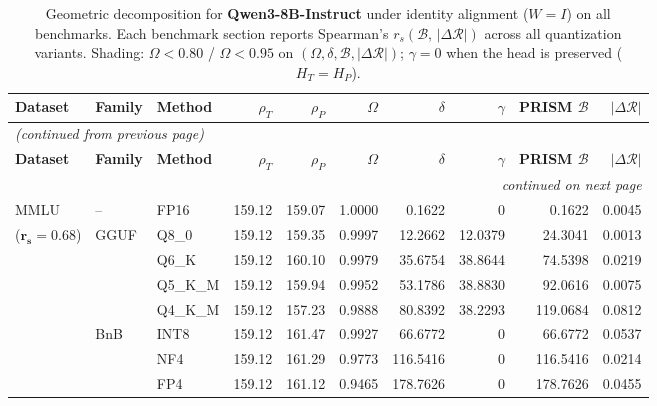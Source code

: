 \begingroup
\small
\setlength{\tabcolsep}{4pt}
\renewcommand{\arraystretch}{1.05}
\setlength{\LTcapwidth}{\textwidth}
\begin{longtable}{ll l rrrrrrr}
\caption{Geometric decomposition for \textbf{Qwen3-8B-Instruct} under identity alignment ($W{=}I$) on all benchmarks. Each benchmark section reports Spearman's $r_s(\mathcal{B},\,|\Delta\mathcal{R}|)$ across all quantization variants. Shading: \colorbox{red!35}{$\Omega{<}0.80$} / \colorbox{red!18}{$\Omega{<}0.95$} on $(\Omega,\delta,\mathcal{B},|\Delta\mathcal{R}|)$; \colorbox{cyan!12}{$\gamma{=}0$} when the head is preserved ($H_T{=}H_P$).}\label{tab:qwen_instruct_decomposition_all_bound}\\
\toprule
\textbf{Dataset} & \textbf{Family} & \textbf{Method} & \textbf{$\rho_T$} & \textbf{$\rho_P$} & \textbf{$\Omega$} & \textbf{$\delta$} & \textbf{$\gamma$} & \textbf{PRISM $\mathcal{B}$} & \textbf{$|\Delta\mathcal{R}|$} \\
\midrule
\endfirsthead
\multicolumn{10}{l}{\small\itshape (continued from previous page)}\\
\toprule
\textbf{Dataset} & \textbf{Family} & \textbf{Method} & \textbf{$\rho_T$} & \textbf{$\rho_P$} & \textbf{$\Omega$} & \textbf{$\delta$} & \textbf{$\gamma$} & \textbf{PRISM $\mathcal{B}$} & \textbf{$|\Delta\mathcal{R}|$} \\
\midrule
\endhead
\midrule
\multicolumn{10}{r}{\small\itshape continued on next page}\\
\endfoot
\bottomrule
\endlastfoot
MMLU & -- & FP16 & 159.12 & 159.07 & 1.0000 & 0.1622 & \cellcolor{cyan!12} $0$ & 0.1622 & 0.0045 \\
{\small ($\mathbf{r_s{=}0.68}$)} & GGUF & Q8\_0 & 159.12 & 159.35 & 0.9997 & 12.2662 & 12.0379 & 24.3041 & 0.0013 \\
 &  & Q6\_K & 159.12 & 160.10 & 0.9979 & 35.6754 & 38.8644 & 74.5398 & 0.0219 \\
 &  & Q5\_K\_M & 159.12 & 159.94 & 0.9952 & 53.1786 & 38.8830 & 92.0616 & 0.0075 \\
 &  & Q4\_K\_M & 159.12 & 157.23 & 0.9888 & 80.8392 & 38.2293 & 119.0684 & 0.0812 \\
 & BnB & INT8 & 159.12 & 161.47 & 0.9927 & 66.6772 & \cellcolor{cyan!12} $0$ & 66.6772 & 0.0537 \\
 &  & NF4 & 159.12 & 161.29 & 0.9773 & 116.5416 & \cellcolor{cyan!12} $0$ & 116.5416 & 0.0214 \\
 &  & FP4 & 159.12 & 161.12 & \cellcolor{red!18} 0.9465 & \cellcolor{red!18} 178.7626 & \cellcolor{cyan!12} $0$ & \cellcolor{red!18} 178.7626 & \cellcolor{red!18} 0.0455 \\

\end{longtable}
